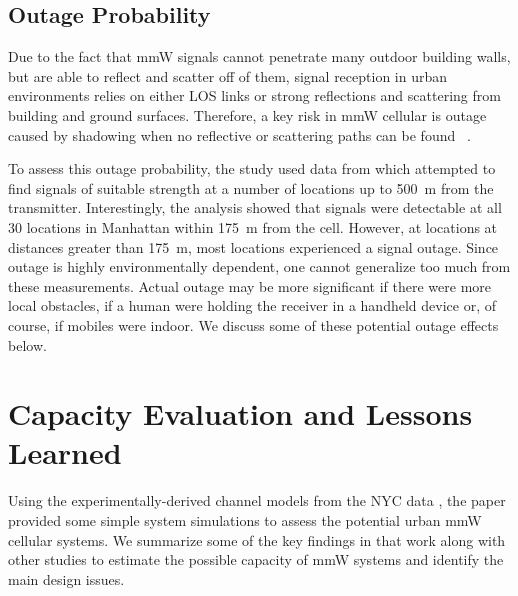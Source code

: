 \documentclass[journal]{IEEEtran}
\begin{document}
\subsection{Outage Probability} \label{sec:outage}

Due to the fact that mmW signals cannot penetrate many
outdoor building walls, but are able to reflect and scatter off of them,
signal reception in urban environments relies on
either LOS links or strong reflections and scattering
from building and ground surfaces.
Therefore, a key risk in mmW cellular is outage caused by
shadowing when no reflective or scattering paths can be found~
\cite{Samimi:AoAD,Nie72G-PIMRC:13}.

To assess this outage probability, the study \cite{AkLiuRanRapEr:13-arxiv}
used data from
\cite{rappaportmillimeter,ben2011millimeter,Rappaport:12-28G,Rappaport:28NYCPenetrationLoss,Samimi:AoAD,Nie72G-PIMRC:13,Rappaport:13-BBmmW}
which attempted to find
signals of suitable strength at a number of locations up to 500~m from the transmitter.
Interestingly, the analysis showed that signals were detectable
at all 30 locations in Manhattan within 175~m from the cell.
However, at locations at distances greater than 175~m,
most locations experienced a signal outage.
Since outage is highly environmentally dependent, one cannot generalize
too much from these measurements.  Actual outage may be more significant
if there were more local obstacles, if a human were holding the
receiver in a handheld device
or, of course, if mobiles were indoor.
We discuss some of these potential outage effects below.

\section{Capacity Evaluation and Lessons Learned} \label{sec:capAnal}

Using the experimentally-derived channel models
from the NYC data \cite{rappaportmillimeter},
the paper \cite{AkLiuRanRapEr:13-arxiv}
provided some simple system simulations to assess the potential urban
mmW cellular systems.
We summarize some of the key findings in that work along with other studies
to estimate the possible capacity of mmW systems and
identify the main design issues.
\end{document}

